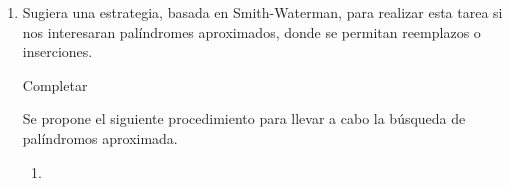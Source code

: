 \begin{enumerate}
	\item Sugiera una estrategia, basada en Smith-Waterman, para realizar esta tarea si nos interesaran
		palíndromes aproximados, donde se permitan reemplazos o inserciones.


			 Completar

			Se propone el siguiente procedimiento para llevar a cabo la búsqueda
			de palíndromos aproximada.

			\begin{enumerate}
				\item 
			\end{enumerate}
			


\end{enumerate}
